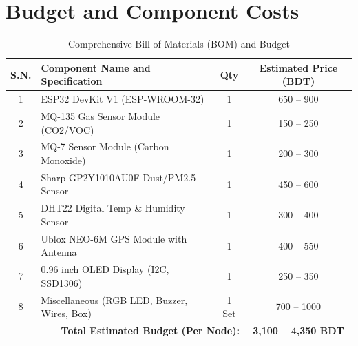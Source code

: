 \documentclass[12pt,a4paper]{report}
\begin{document}
\chapter{Budget and Component Costs}
\begin{table}[H]
    \centering
    \begin{tabularx}{\textwidth}{|c|X|c|c|}
        \hline
        \textbf{S.N.} & \textbf{Component Name and Specification} & \textbf{Qty} & \textbf{Estimated Price (BDT)} \\ \hline
        1 & ESP32 DevKit V1 (ESP-WROOM-32) & 1 & 650 -- 900 \\ \hline
        2 & MQ-135 Gas Sensor Module (CO2/VOC) & 1 & 150 -- 250 \\ \hline
        3 & MQ-7 Sensor Module (Carbon Monoxide) & 1 & 200 -- 300 \\ \hline
        4 & Sharp GP2Y1010AU0F Dust/PM2.5 Sensor & 1 & 450 -- 600 \\ \hline
        5 & DHT22 Digital Temp \& Humidity Sensor & 1 & 300 -- 400 \\ \hline
        6 & Ublox NEO-6M GPS Module with Antenna & 1 & 400 -- 550 \\ \hline
        7 & 0.96 inch OLED Display (I2C, SSD1306) & 1 & 250 -- 350 \\ \hline
        8 & Miscellaneous (RGB LED, Buzzer, Wires, Box) & 1 Set & 700 -- 1000 \\ \hline
        \multicolumn{3}{|r|}{\textbf{Total Estimated Budget (Per Node):}} & \textbf{3,100 -- 4,350 BDT} \\ \hline
    \end{tabularx}
    \caption{Comprehensive Bill of Materials (BOM) and Budget}
\end{table}

\end{document}
